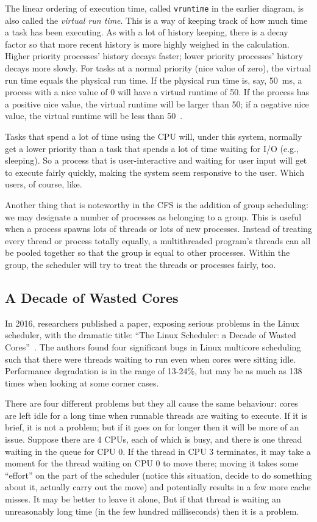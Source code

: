 The linear ordering of execution time, called \texttt{vruntime} in the earlier diagram, is also called the \textit{virtual run time}. This is a way of keeping track of how much time a task has been executing. As with a lot of history keeping, there is a decay factor  so that more recent history is more highly weighed in the calculation. Higher priority processes' history decays faster; lower priority processes' history decays more slowly. For tasks at a normal priority (nice value of zero), the virtual run time equals the physical run time. If the physical run time is, say, 50~ms, a process with a nice value of 0 will have a virtual runtime of 50. If the process has a positive nice value, the virtual runtime will be larger than 50; if a negative nice value, the virtual runtime will be less than 50~\cite{osc}.

Tasks that spend a lot of time using the CPU will, under this system, normally get a lower priority than a task that spends a lot of time waiting for I/O (e.g., sleeping). So a process that is user-interactive and waiting for user input will get to execute fairly quickly, making the system seem responsive to the user. Which users, of course, like.

Another thing that is noteworthy in the CFS is the addition of group scheduling: we may designate a number of processes as belonging to a group. This is useful when a process spawns lots of threads or lots of new processes. Instead of treating every thread or process totally equally, a multithreaded program's threads can all be pooled together so that the group is equal to other processes. Within the group, the scheduler will try to treat the threads or processes fairly, too.

\subsection*{A Decade of Wasted Cores}

In 2016, researchers published a paper, exposing serious problems in the Linux scheduler, with the dramatic title: ``The Linux Scheduler: a Decade of Wasted Cores''~\cite{wastedcores}. The authors found four significant bugs in Linux multicore scheduling such that there were threads waiting to run even when cores were sitting idle. Performance degradation is in the range of 13-24\%, but may be as much as 138 times when looking at some corner cases. 

There are four different problems but they all cause the same behaviour: cores are left idle for a long time when runnable threads are waiting to execute. If it is brief, it is not a problem; but if it goes on for longer then it will be more of an issue. Suppose there are 4 CPUs, each of which is busy, and there is one thread waiting in the queue for CPU 0. If the thread in CPU 3 terminates, it may take a moment for the thread waiting on CPU 0 to move there; moving it takes some ``effort'' on the part of the scheduler (notice this situation, decide to do something about it, actually carry out the move) and potentially results in a few more cache misses. It may be better to leave it alone, But if that thread is waiting an unreasonably long time (in the few hundred milliseconds) then it is a problem.

